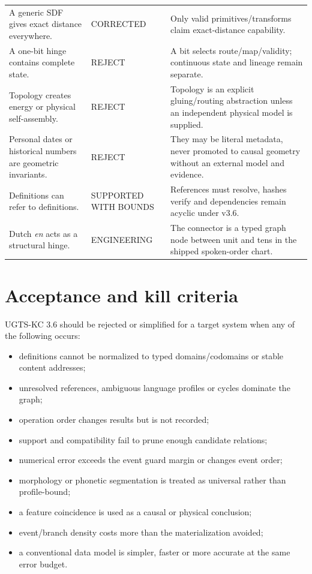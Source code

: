 \documentclass[10pt,a4paper]{article}
\begin{document}
\begin{longtable}{>{\raggedright\arraybackslash}p{4.5cm}>{\raggedright\arraybackslash}p{2.4cm}>{\raggedright\arraybackslash}p{8.5cm}}
A generic SDF gives exact distance everywhere. & CORRECTED & Only valid primitives/transforms claim exact-distance capability. \\
A one-bit hinge contains complete state. & REJECT & A bit selects route/map/validity; continuous state and lineage remain separate. \\
Topology creates energy or physical self-assembly. & REJECT & Topology is an explicit gluing/routing abstraction unless an independent physical model is supplied. \\
Personal dates or historical numbers are geometric invariants. & REJECT & They may be literal metadata, never promoted to causal geometry without an external model and evidence. \\
Definitions can refer to definitions. & SUPPORTED WITH BOUNDS & References must resolve, hashes verify and dependencies remain acyclic under v3.6. \\
Dutch \emph{en} acts as a structural hinge. & ENGINEERING & The connector is a typed graph node between unit and tens in the shipped spoken-order chart. \\
\bottomrule
\end{longtable}

\section{Acceptance and kill criteria}
UGTS-KC 3.6 should be rejected or simplified for a target system when any of the following occurs:
\begin{itemize}
\item definitions cannot be normalized to typed domains/codomains or stable content addresses;
\item unresolved references, ambiguous language profiles or cycles dominate the graph;
\item operation order changes results but is not recorded;
\item support and compatibility fail to prune enough candidate relations;
\item numerical error exceeds the event guard margin or changes event order;
\item morphology or phonetic segmentation is treated as universal rather than profile-bound;
\item a feature coincidence is used as a causal or physical conclusion;
\item event/branch density costs more than the materialization avoided;
\item a conventional data model is simpler, faster or more accurate at the same error budget.
\end{itemize}
\end{document}
